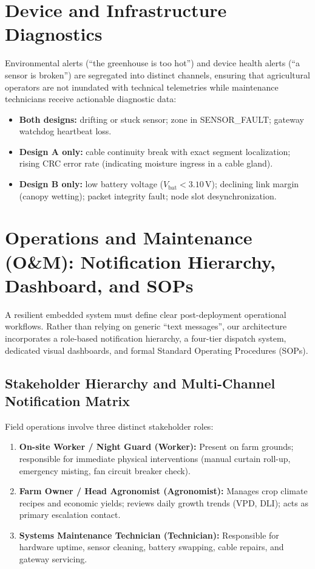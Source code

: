 \documentclass[11pt,a4paper]{report}
\begin{document}
\section{Device and Infrastructure Diagnostics}\label{sec:devdiag}
Environmental alerts (``the greenhouse is too hot'') and device health alerts (``a sensor is broken'') are segregated into distinct channels, ensuring that agricultural operators are not inundated with technical telemetries while maintenance technicians receive actionable diagnostic data:
\begin{itemize}[noitemsep]
  \item \textbf{Both designs:} drifting or stuck sensor; zone in SENSOR\_FAULT; gateway watchdog heartbeat loss.
  \item \textbf{Design A only:} cable continuity break with exact segment localization; rising CRC error rate (indicating moisture ingress in a cable gland).
  \item \textbf{Design B only:} low battery voltage ($V_{\text{bat}} < 3.10\,\text{V}$); declining link margin (canopy wetting); packet integrity fault; node slot desynchronization.
\end{itemize}

\section{Operations and Maintenance (O\&M): Notification Hierarchy, Dashboard, and SOPs}\label{sec:om}
A resilient embedded system must define clear post-deployment operational workflows. Rather than relying on generic ``text messages'', our architecture incorporates a role-based notification hierarchy, a four-tier dispatch system, dedicated visual dashboards, and formal Standard Operating Procedures (SOPs).

\subsection{Stakeholder Hierarchy and Multi-Channel Notification Matrix}
Field operations involve three distinct stakeholder roles:
\begin{enumerate}[noitemsep]
  \item \textbf{On-site Worker / Night Guard (Worker):} Present on farm grounds; responsible for immediate physical interventions (manual curtain roll-up, emergency misting, fan circuit breaker check).
  \item \textbf{Farm Owner / Head Agronomist (Agronomist):} Manages crop climate recipes and economic yields; reviews daily growth trends (VPD, DLI); acts as primary escalation contact.
  \item \textbf{Systems Maintenance Technician (Technician):} Responsible for hardware uptime, sensor cleaning, battery swapping, cable repairs, and gateway servicing.
\end{enumerate}
\end{document}
